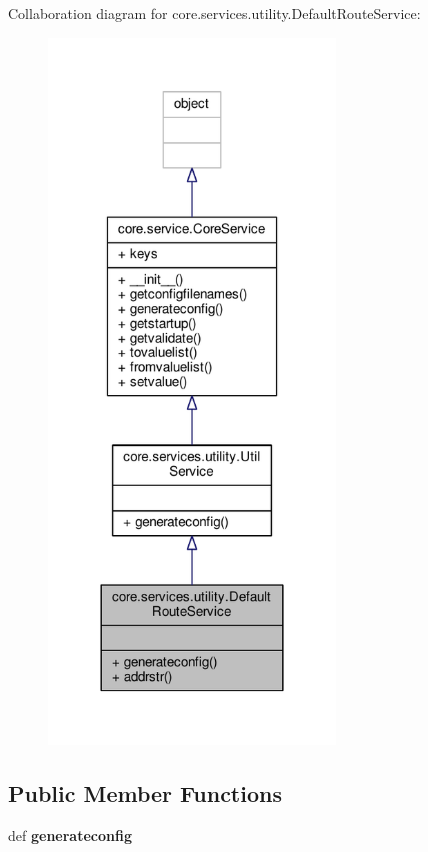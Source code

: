 Collaboration diagram for core.\+services.\+utility.\+Default\+Route\+Service\+:
\nopagebreak
\begin{figure}[H]
\begin{center}
\leavevmode
\includegraphics[width=216pt]{classcore_1_1services_1_1utility_1_1_default_route_service__coll__graph}
\end{center}
\end{figure}
\subsection*{Public Member Functions}
\begin{DoxyCompactItemize}
\item 
\hypertarget{classcore_1_1services_1_1utility_1_1_default_route_service_aa9a1ceb649a85c91cc299b2906bf3a4a}{def {\bfseries generateconfig}}\label{classcore_1_1services_1_1utility_1_1_default_route_service_aa9a1ceb649a85c91cc299b2906bf3a4a}

\end{DoxyCompactItemize}
